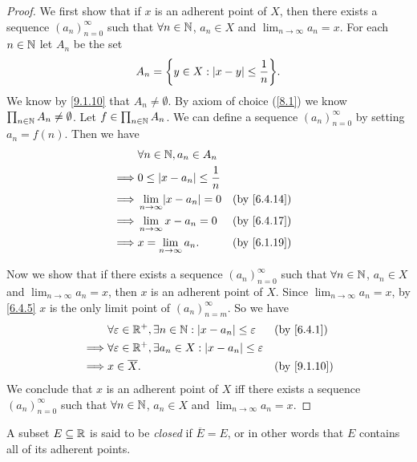 \begin{proof}
	We first show that if \(x\) is an adherent point of \(X\), then there exists a sequence \((a_n)_{n = 0}^\infty\) such that \(\forall n \in \mathbb{N}\), \(a_n \in X\) and \(\lim_{n \to \infty} a_n = x\).
	For each \(n \in \mathbb{N}\) let \(A_n\) be the set
	\[
		A_n = \set{y \in X : \abs{x - y} \leq \dfrac{1}{n}}.
	\]
	We know by \cref{9.1.10} that \(A_n \neq \emptyset\).
	By axiom of choice (\cref{8.1}) we know \(\prod_{n \in \mathbb{N}} A_n \neq \emptyset\).
	Let \(f \in \prod_{n \in \mathbb{N}} A_n\).
	We can define a sequence \((a_n)_{n = 0}^\infty\) by setting \(a_n = f(n)\).
	Then we have
	\begin{align*}
		         & \forall n \in \N, a_n \in A_n                           \\
		\implies & 0 \leq \abs{x - a_n} \leq \dfrac{1}{n}                  \\
		\implies & \lim_{n \to \infty} \abs{x - a_n} = 0  &  & \by{6.4.14} \\
		\implies & \lim_{n \to \infty} x - a_n = 0        &  & \by{6.4.17} \\
		\implies & x = \lim_{n \to \infty} a_n.           &  & \by{6.1.19}
	\end{align*}

	Now we show that if there exists a sequence \((a_n)_{n = 0}^\infty\) such that \(\forall n \in \mathbb{N}\), \(a_n \in X\) and \(\lim_{n \to \infty} a_n = x\), then \(x\) is an adherent point of \(X\).
	Since \(\lim_{n \to \infty} a_n = x\), by \cref{6.4.5} \(x\) is the only limit point of \((a_n)_{n = m}^\infty\).
	So we have
	\begin{align*}
		         & \forall \varepsilon \in \R^+, \exists n \in \N : \abs{x - a_n} \leq \varepsilon  &  & \by{6.4.1}  \\
		\implies & \forall \varepsilon \in \R^+, \exists a_n \in X : \abs{x - a_n} \leq \varepsilon                  \\
		\implies & x \in \overline{X}.                                                              &  & \by{9.1.10}
	\end{align*}
	We conclude that \(x\) is an adherent point of \(X\) iff there exists a sequence \((a_n)_{n = 0}^\infty\) such that \(\forall n \in \mathbb{N}\), \(a_n \in X\) and \(\lim_{n \to \infty} a_n = x\).
\end{proof}

\begin{defn}\label{9.1.15}
	A subset \(E \subseteq \mathbb{R}\) is said to be \emph{closed} if \(\overline{E} = E\), or in other words that \(E\) contains all of its adherent points.
\end{defn}

